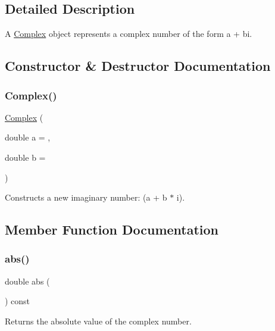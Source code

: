 \subsection{Detailed Description}
A \mbox{\hyperlink{classComplex}{Complex}} object represents a complex number of the form a + bi. 

\subsection{Constructor \& Destructor Documentation}
\mbox{\label{classComplex_a900a80f2ea5c0c3dc9393402b6ce8df3}} 
\subsubsection{\texorpdfstring{Complex()}{Complex()}}
{\footnotesize\ttfamily \mbox{\hyperlink{classComplex}{Complex}} (\begin{DoxyParamCaption}\item[{double}]{a = {},  }\item[{double}]{b = {} }\end{DoxyParamCaption})}



Constructs a new imaginary number\+: (a + b $\ast$ i). 



\subsection{Member Function Documentation}
\mbox{\label{classComplex_ad534b137e1216937005dd363a5579ed0}} 
\subsubsection{\texorpdfstring{abs()}{abs()}}
{\footnotesize\ttfamily double abs (\begin{DoxyParamCaption}{ }\end{DoxyParamCaption}) const}



Returns the absolute value of the complex number. 

\mbox{\label{classComplex_ac6d0f1ec6a24b5904bc3a206b3c117ff}} 
